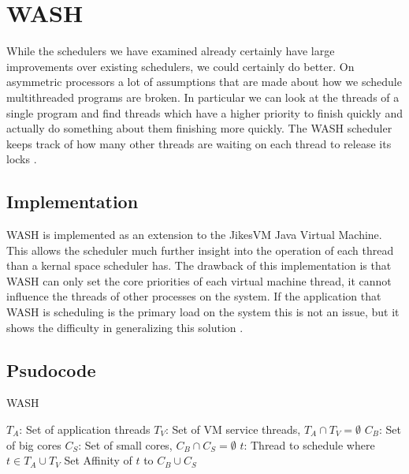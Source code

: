 \section{WASH}
While the schedulers we have examined already certainly have large improvements over existing schedulers, we could certainly do better.
On asymmetric processors a lot of assumptions that are made about how we schedule multithreaded programs are broken.
In particular we can look at the threads of a single program and find threads which have a higher priority to finish quickly and actually do something about them finishing more quickly.
The WASH scheduler keeps track of how many other threads are waiting on each thread to release its locks \cite{Jibaja:2016:PPA:2854038.2854047}.

\subsection{Implementation}
WASH is implemented as an extension to the JikesVM Java Virtual Machine.
This allows the scheduler much further insight into the operation of each thread than a kernal space scheduler has.
The drawback of this implementation is that WASH can only set the core priorities of each virtual machine thread, it cannot influence the threads of other processes on the system.
If the application that WASH is scheduling is the primary load on the system this is not an issue, but it shows the difficulty in generalizing this solution \cite{Jibaja:2016:PPA:2854038.2854047}.

\subsection{Psudocode}

\begin{algorithm}[H]
\caption{WASH}\label{euclid}
\begin{algorithmic}
		\State $T_A$: Set of application threads
		\State $T_V$: Set of VM service threads, $T_A \cap T_V = \emptyset$
		\State $C_B$: Set of big cores
		\State $C_S$: Set of small cores, $C_B \cap C_S = \emptyset$
		\State $t$: Thread to schedule where $t \in T_A \cup T_V$
			\EndIf
				\State Set Affinity of $t$ to $C_B \cup C_S$
			\EndIf
		\EndIf
	\EndFunction
\end{algorithmic}
\end{algorithm}
\cite{Jibaja:2016:PPA:2854038.2854047}